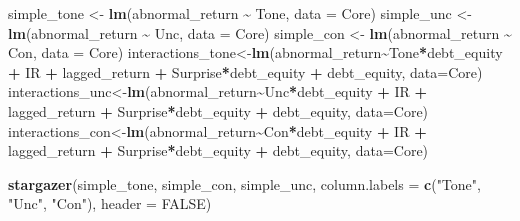 \documentclass[
]{article}
\newenvironment{Shaded}{\begin{snugshade}}{\end{snugshade}}
\newcommand{\AttributeTok}[1]{\textcolor[rgb]{0.13,0.29,0.53}{#1}}
\newcommand{\ConstantTok}[1]{\textcolor[rgb]{0.56,0.35,0.01}{#1}}
\newcommand{\FunctionTok}[1]{\textcolor[rgb]{0.13,0.29,0.53}{\textbf{#1}}}
\newcommand{\NormalTok}[1]{#1}
\newcommand{\OtherTok}[1]{\textcolor[rgb]{0.56,0.35,0.01}{#1}}
\newcommand{\SpecialCharTok}[1]{\textcolor[rgb]{0.81,0.36,0.00}{\textbf{#1}}}
\newcommand{\StringTok}[1]{\textcolor[rgb]{0.31,0.60,0.02}{#1}}
\begin{document}
\begin{Shaded}
\begin{Highlighting}[]
\NormalTok{simple\_tone }\OtherTok{\textless{}{-}} \FunctionTok{lm}\NormalTok{(abnormal\_return }\SpecialCharTok{\textasciitilde{}}\NormalTok{ Tone, }\AttributeTok{data =}\NormalTok{ Core)}
\NormalTok{simple\_unc }\OtherTok{\textless{}{-}} \FunctionTok{lm}\NormalTok{(abnormal\_return }\SpecialCharTok{\textasciitilde{}}\NormalTok{ Unc, }\AttributeTok{data =}\NormalTok{ Core)}
\NormalTok{simple\_con }\OtherTok{\textless{}{-}} \FunctionTok{lm}\NormalTok{(abnormal\_return }\SpecialCharTok{\textasciitilde{}}\NormalTok{ Con, }\AttributeTok{data =}\NormalTok{ Core)}
\NormalTok{interactions\_tone}\OtherTok{\textless{}{-}}\FunctionTok{lm}\NormalTok{(abnormal\_return}\SpecialCharTok{\textasciitilde{}}\NormalTok{Tone}\SpecialCharTok{*}\NormalTok{debt\_equity }\SpecialCharTok{+}\NormalTok{ IR }\SpecialCharTok{+}\NormalTok{ lagged\_return }\SpecialCharTok{+}\NormalTok{ Surprise}\SpecialCharTok{*}\NormalTok{debt\_equity }\SpecialCharTok{+}\NormalTok{ debt\_equity, }\AttributeTok{data=}\NormalTok{Core)}
\NormalTok{interactions\_unc}\OtherTok{\textless{}{-}}\FunctionTok{lm}\NormalTok{(abnormal\_return}\SpecialCharTok{\textasciitilde{}}\NormalTok{Unc}\SpecialCharTok{*}\NormalTok{debt\_equity }\SpecialCharTok{+}\NormalTok{ IR }\SpecialCharTok{+}\NormalTok{ lagged\_return }\SpecialCharTok{+}\NormalTok{ Surprise}\SpecialCharTok{*}\NormalTok{debt\_equity }\SpecialCharTok{+}\NormalTok{ debt\_equity, }\AttributeTok{data=}\NormalTok{Core)}
\NormalTok{interactions\_con}\OtherTok{\textless{}{-}}\FunctionTok{lm}\NormalTok{(abnormal\_return}\SpecialCharTok{\textasciitilde{}}\NormalTok{Con}\SpecialCharTok{*}\NormalTok{debt\_equity }\SpecialCharTok{+}\NormalTok{ IR }\SpecialCharTok{+}\NormalTok{ lagged\_return }\SpecialCharTok{+}\NormalTok{ Surprise}\SpecialCharTok{*}\NormalTok{debt\_equity }\SpecialCharTok{+}\NormalTok{ debt\_equity, }\AttributeTok{data=}\NormalTok{Core)}

\FunctionTok{stargazer}\NormalTok{(simple\_tone, simple\_con, simple\_unc, }
          \AttributeTok{column.labels =} \FunctionTok{c}\NormalTok{(}\StringTok{"Tone"}\NormalTok{, }\StringTok{"Unc"}\NormalTok{, }\StringTok{"Con"}\NormalTok{), }\AttributeTok{header =} \ConstantTok{FALSE}\NormalTok{)}
\end{Highlighting}
\end{Shaded}
\end{document}
